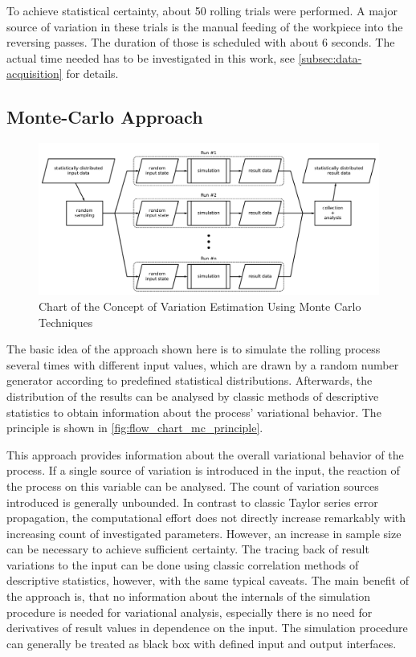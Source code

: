 To achieve statistical certainty, about 50 rolling trials were performed.
A major source of variation in these trials is the manual feeding of the workpiece into the reversing passes.
The duration of those is scheduled with about 6 seconds.
The actual time needed has to be investigated in this work, see \autoref{subsec:data-acquisition} for details.

\subsection{Monte-Carlo Approach}\label{subsec:monte-carlo-approach}

\begin{figure}
    \centering
    \includegraphics[width=\linewidth]{img/flow_chart_mc_principle}
    \caption{Chart of the Concept of Variation Estimation Using Monte Carlo Techniques}
    \label{fig:flow_chart_mc_principle}
\end{figure}

The basic idea of the approach shown here is to simulate the rolling process several times with different input values, which are drawn by a random number generator according to predefined statistical distributions.
Afterwards, the distribution of the results can be analysed by classic methods of descriptive statistics to obtain information about the process' variational behavior.
The principle is shown in \autoref{fig:flow_chart_mc_principle}.

This approach provides information about the overall variational behavior of the process.
If a single source of variation is introduced in the input, the reaction of the process on this variable can be analysed.
The count of variation sources introduced is generally unbounded.
In contrast to classic Taylor series error propagation, the computational effort does not directly increase remarkably with increasing count of investigated parameters.
However, an increase in sample size can be necessary to achieve sufficient certainty.
The tracing back of result variations to the input can be done using classic correlation methods of descriptive statistics, however, with the same typical caveats.
The main benefit of the approach is, that no information about the internals of the simulation procedure is needed for variational analysis, especially there is no need for derivatives of result values in dependence on the input.
The simulation procedure can generally be treated as black box with defined input and output interfaces.

